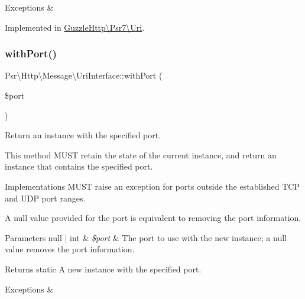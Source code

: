 \begin{DoxyExceptions}{Exceptions}
{\em } & \\
\hline
\end{DoxyExceptions}


Implemented in \hyperlink{classGuzzleHttp_1_1Psr7_1_1Uri_a80fdae1020f7a4bd60cc8f117a8966e3}{Guzzle\+Http\textbackslash{}\+Psr7\textbackslash{}\+Uri}.

\mbox{\label{interfacePsr_1_1Http_1_1Message_1_1UriInterface_aed81cb605b9bec89404a78ff550125a5}} 
\subsubsection{\texorpdfstring{with\+Port()}{withPort()}}
{\footnotesize\ttfamily Psr\textbackslash{}\+Http\textbackslash{}\+Message\textbackslash{}\+Uri\+Interface\+::with\+Port (\begin{DoxyParamCaption}\item[{}]{\$port }\end{DoxyParamCaption})}

Return an instance with the specified port.

This method M\+U\+ST retain the state of the current instance, and return an instance that contains the specified port.

Implementations M\+U\+ST raise an exception for ports outside the established T\+CP and U\+DP port ranges.

A null value provided for the port is equivalent to removing the port information.


\begin{DoxyParams}[1]{Parameters}
null | int & {\em \$port} & The port to use with the new instance; a null value removes the port information. \\
\hline
\end{DoxyParams}
\begin{DoxyReturn}{Returns}
static A new instance with the specified port. 
\end{DoxyReturn}

\begin{DoxyExceptions}{Exceptions}
{\em } & \\
\hline
\end{DoxyExceptions}


